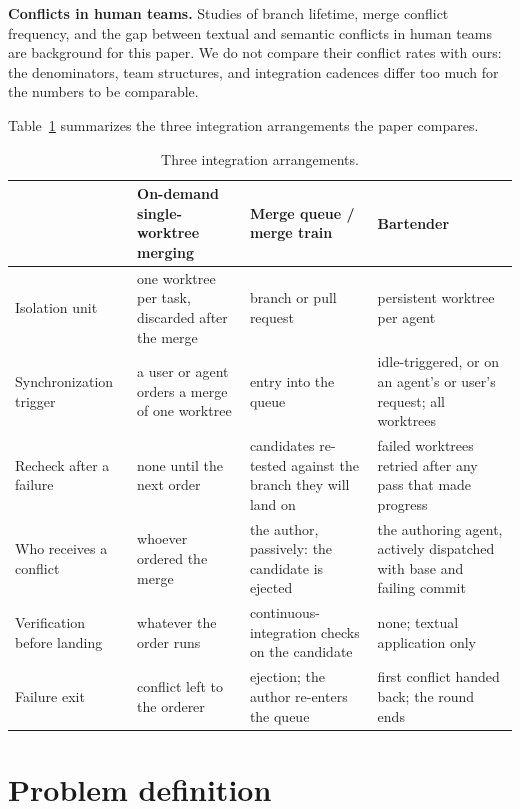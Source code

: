 \documentclass[pdflatex,sn-mathphys-ay]{sn-jnl}
\theoremstyle{thmstyleone}
\theoremstyle{thmstylethree}
\begin{document}
\textbf{Conflicts in human teams.} Studies of branch lifetime, merge conflict frequency, and the gap between textual and semantic conflicts in human teams \citep{bird2011-ownership,brun2011-conflicts} are background for this paper. We do not compare their conflict rates with ours: the denominators, team structures, and integration cadences differ too much for the numbers to be comparable.

Table~\ref{tab:integration-arrangements} summarizes the three integration arrangements the paper compares.

\begin{table}[tbp]
\caption{Three integration arrangements.}\label{tab:integration-arrangements}
\centering\small
\setlength{\tabcolsep}{4pt}
\renewcommand{\arraystretch}{1.12}
\begin{tabularx}{\textwidth}{@{}>{\raggedright\arraybackslash}p{}*{3}{>{\raggedright\arraybackslash}X}@{}}
\toprule
 & On-demand single-worktree merging & Merge queue / merge train \citep{github-merge-queue,gitlab-merge-trains} & Bartender \\
\midrule
Isolation unit & one worktree per task, discarded after the merge & branch or pull request & persistent worktree per agent \\
\addlinespace[3pt]
Synchronization trigger & a user or agent orders a merge of one worktree & entry into the queue & idle-triggered, or on an agent's or user's request; all worktrees \\
\addlinespace[3pt]
Recheck after a failure & none until the next order & candidates re-tested against the branch they will land on & failed worktrees retried after any pass that made progress \\
\addlinespace[3pt]
Who receives a conflict & whoever ordered the merge & the author, passively: the candidate is ejected & the authoring agent, actively dispatched with base and failing commit \\
\addlinespace[3pt]
Verification before landing & whatever the order runs & continuous-integration checks on the candidate & none; textual application only \\
\addlinespace[3pt]
Failure exit & conflict left to the orderer & ejection; the author re-enters the queue & first conflict handed back; the round ends \\
\bottomrule
\end{tabularx}
\end{table}
\section{Problem definition}\label{sec:problem}
\end{document}

